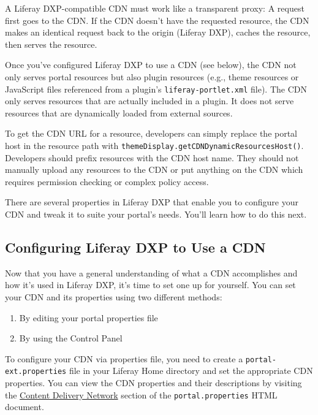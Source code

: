 A Liferay DXP-compatible CDN must work like a transparent proxy: A
request first goes to the CDN. If the CDN doesn't have the requested
resource, the CDN makes an identical request back to the origin (Liferay
DXP), caches the resource, then serves the resource.

Once you've configured Liferay DXP to use a CDN (see below), the CDN not
only serves portal resources but also plugin resources (e.g., theme
resources or JavaScript files referenced from a plugin's
\texttt{liferay-portlet.xml} file). The CDN only serves resources that
are actually included in a plugin. It does not serve resources that are
dynamically loaded from external sources.

To get the CDN URL for a resource, developers can simply replace the
portal host in the resource path with
\texttt{themeDisplay.getCDNDynamicResourcesHost()}. Developers should
prefix resources with the CDN host name. They should not manually upload
any resources to the CDN or put anything on the CDN which requires
permission checking or complex policy access.

There are several properties in Liferay DXP that enable you to configure
your CDN and tweak it to suite your portal's needs. You'll learn how to
do this next.

\subsection{Configuring Liferay DXP to Use a
CDN}\label{configuring-liferay-dxp-to-use-a-cdn}

Now that you have a general understanding of what a CDN accomplishes and
how it's used in Liferay DXP, it's time to set one up for yourself. You
can set your CDN and its properties using two different methods:

\begin{enumerate}
\def\labelenumi{\arabic{enumi}.}
\tightlist
\item
  By editing your portal properties file
\item
  By using the Control Panel
\end{enumerate}

To configure your CDN via properties file, you need to create a
\texttt{portal-ext.properties} file in your Liferay Home directory and
set the appropriate CDN properties. You can view the CDN properties and
their descriptions by visiting the
\href{@platform-ref@/7.0-latest/propertiesdoc/portal.properties.html\#Content\%20Delivery\%20Network}{Content
Delivery Network} section of the \texttt{portal.properties} HTML
document.

